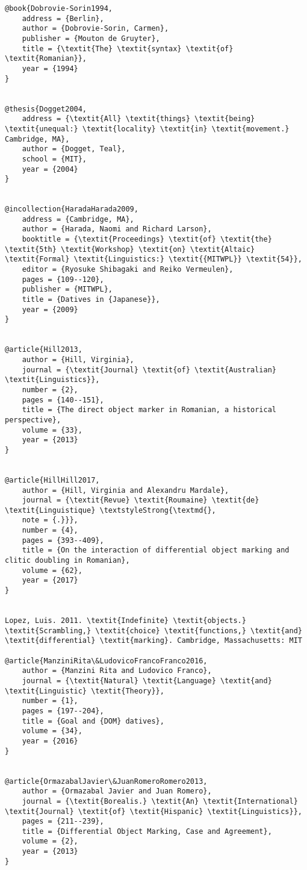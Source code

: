 \documentclass[output=paper,modfonts,nonflat]{langsci/langscibook}
\begin{document}
\begin{verbatim}
@book{Dobrovie-Sorin1994,
	address = {Berlin},
	author = {Dobrovie-Sorin, Carmen},
	publisher = {Mouton de Gruyter},
	title = {\textit{The} \textit{syntax} \textit{of} \textit{Romanian}},
	year = {1994}
}


@thesis{Dogget2004,
	address = {\textit{All} \textit{things} \textit{being} \textit{unequal:} \textit{locality} \textit{in} \textit{movement.} Cambridge, MA},
	author = {Dogget, Teal},
	school = {MIT},
	year = {2004}
}


@incollection{HaradaHarada2009,
	address = {Cambridge, MA},
	author = {Harada, Naomi and Richard Larson},
	booktitle = {\textit{Proceedings} \textit{of} \textit{the} \textit{5th} \textit{Workshop} \textit{on} \textit{Altaic} \textit{Formal} \textit{Linguistics:} \textit{{MITWPL}} \textit{54}},
	editor = {Ryosuke Shibagaki and Reiko Vermeulen},
	pages = {109--120},
	publisher = {MITWPL},
	title = {Datives in {Japanese}},
	year = {2009}
}


@article{Hill2013,
	author = {Hill, Virginia},
	journal = {\textit{Journal} \textit{of} \textit{Australian} \textit{Linguistics}},
	number = {2},
	pages = {140--151},
	title = {The direct object marker in Romanian, a historical perspective},
	volume = {33},
	year = {2013}
}


@article{HillHill2017,
	author = {Hill, Virginia and Alexandru Mardale},
	journal = {\textit{Revue} \textit{Roumaine} \textit{de} \textit{Linguistique} \textstyleStrong{\textmd{},
	note = {.}}},
	number = {4},
	pages = {393--409},
	title = {On the interaction of differential object marking and clitic doubling in Romanian},
	volume = {62},
	year = {2017}
}


Lopez, Luis. 2011. \textit{Indefinite} \textit{objects.} \textit{Scrambling,} \textit{choice} \textit{functions,} \textit{and} \textit{differential} \textit{marking}. Cambridge, Massachusetts: MIT

@article{ManziniRita\&LudovicoFrancoFranco2016,
	author = {Manzini Rita and Ludovico Franco},
	journal = {\textit{Natural} \textit{Language} \textit{and} \textit{Linguistic} \textit{Theory}},
	number = {1},
	pages = {197--204},
	title = {Goal and {DOM} datives},
	volume = {34},
	year = {2016}
}


@article{OrmazabalJavier\&JuanRomeroRomero2013,
	author = {Ormazabal Javier and Juan Romero},
	journal = {\textit{Borealis.} \textit{An} \textit{International} \textit{Journal} \textit{of} \textit{Hispanic} \textit{Linguistics}},
	pages = {211--239},
	title = {Differential Object Marking, Case and Agreement},
	volume = {2},
	year = {2013}
}



\end{verbatim}
\end{document}
